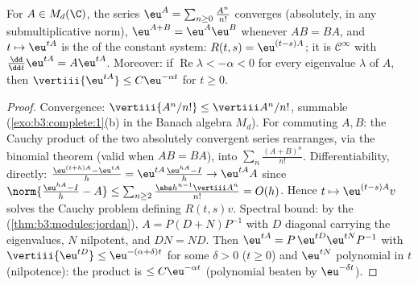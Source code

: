 \begin{theorem}\label{thm:b3:ode:matrixexp}
For $A \in M_d(\C)$, the series $\eu^{A} =
\sum_{n\geq0}\frac{A^n}{n!}$ converges (absolutely, in any
submultiplicative norm), $\eu^{A+B} = \eu^A\eu^B$ whenever
$AB = BA$, and $t \mapsto \eu^{tA}$ is the  of the
constant system: $R(t,s) = \eu^{(t-s)A}$; it is $\mathcal
C^\infty$ with $\frac{\dd}{\dd t}\eu^{tA} = A\eu^{tA}$.
Moreover: if $\operatorname{Re}\lambda < -\alpha < 0$ for
every eigenvalue $\lambda$ of $A$, then $\vertiii{\eu^{tA}}
\leq C\eu^{-\alpha t}$ for $t \geq 0$.
\end{theorem}

\begin{proof}
Convergence: $\vertiii{A^n/n!} \leq \vertiii A^n/n!$, summable
(\cref{exo:b3:complete:1}(b) in the Banach algebra
$M_d$). For commuting $A, B$: the Cauchy product of the two
absolutely convergent series rearranges, via the binomial
theorem (valid when $AB = BA$), into
$\sum_n\frac{(A+B)^n}{n!}$. Differentiability, directly:
$\frac{\eu^{(t+h)A} - \eu^{tA}}h = \eu^{tA}\frac{\eu^{hA} -
I}{h} \to \eu^{tA}A$ since $\norm{\frac{\eu^{hA} - I}h - A}
\leq \sum_{n\geq2}\frac{\abs h^{n-1}\vertiii A^n}{n!} =
O(h)$. Hence $t \mapsto \eu^{(t - s)A}v$ solves the Cauchy
problem defining $R(t,s)v$. Spectral bound: by the 
(\cref{thm:b3:modules:jordan}), $A = P(D + N)P^{-1}$ with $D$
diagonal carrying the eigenvalues, $N$ nilpotent, and $DN =
ND$. Then $\eu^{tA} = P\,\eu^{tD}\eu^{tN}P^{-1}$ with
$\vertiii{\eu^{tD}} \leq \eu^{-(\alpha + \delta)t}$ for some
$\delta > 0$ ($t \geq 0$) and $\eu^{tN}$ polynomial in $t$
(nilpotence): the product is $\leq C\eu^{-\alpha t}$
(polynomial beaten by $\eu^{-\delta t}$).
\end{proof}

